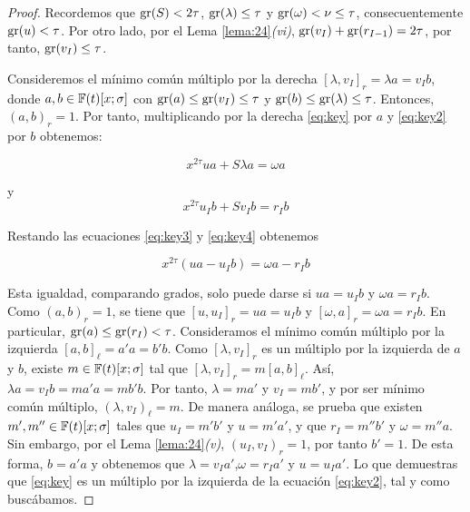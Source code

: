 \begin{proof}
    Recordemos que $\operatorname{gr}(S) < 2\tau$, $\operatorname{gr}(\lambda) \leq \tau$ y $\operatorname{gr}(\omega) < \nu \leq \tau$, consecuentemente $\operatorname{gr}(u) < \tau$. Por otro lado, por el Lema \ref{lema:24}\textit{(vi)}, $\operatorname{gr}(v_I) + \operatorname{gr}(r_{I-1}) = 2\tau$, por tanto, $\operatorname{gr}(v_I) \leq \tau$.

    Consideremos el mínimo común múltiplo por la derecha $[\lambda,v_I]_r = \lambda a = v_Ib$, donde $a,b \in \mathbb{F}(t)[x;\sigma]$ con $\operatorname{gr}(a) \leq \operatorname{gr}(v_I) \leq \tau$ y $\operatorname{gr}(b) \leq \operatorname{gr}(\lambda) \leq \tau$. Entonces, $(a,b)_r = 1$. Por tanto, multiplicando por la derecha \eqref{eq:key} por $a$ y \eqref{eq:key2} por $b$ obtenemos:

    \begin{equation}\label{eq:key3}
        x^{2\tau}ua + S\lambda a = \omega a
    \end{equation}
        
y        
    \begin{equation}\label{eq:key4}
        x^{2\tau}u_Ib + Sv_Ib = r_Ib
    \end{equation}

Restando las ecuaciones \eqref{eq:key3} y \eqref{eq:key4} obtenemos

\begin{equation}
    x^{2\tau}(ua - u_Ib) = \omega a - r_Ib
\end{equation}

Esta igualdad, comparando grados, solo puede darse si $ua = u_Ib$ y $\omega a = r_Ib$. Como $(a,b)_r = 1$, se tiene que $[u,u_I]_r = ua = u_Ib$ y $[\omega,a]_r = \omega a = r_Ib$. En particular, $\operatorname{gr}(a) \leq \operatorname{gr}(r_I) < \tau$. Consideramos el mínimo común múltiplo por la izquierda $[a,b]_\ell = a'a = b'b$.  Como $[\lambda,v_I]_r$ es un múltiplo por la izquierda de $a$ y $b$, existe $m \in \mathbb{F}(t)[x;\sigma]$ tal que $[\lambda,v_I]_r = m[a,b]_\ell$. Así, $\lambda a = v_Ib = ma'a = mb'b$. Por tanto, $\lambda = ma'$ y $v_I = mb'$, y por ser mínimo común múltiplo, $(\lambda,v_I)_\ell = m$. De manera análoga, se prueba que existen $m',m'' \in \mathbb{F}(t)[x;\sigma]$ tales que $u_I = m'b'$ y $u = m'a'$, y que $r_I = m''b'$ y $\omega = m''a$. Sin embargo, por el Lema \ref{lema:24}\textit{(v)}, $(u_I,v_I)_r = 1$, por tanto $b'=1$. De esta forma, $b = a'a$ y obtenemos que $\lambda = v_Ia'$,$\omega = r_Ia'$ y $u = u_Ia'$. Lo que demuestras que \eqref{eq:key} es un múltiplo por la izquierda de la ecuación \eqref{eq:key2}, tal y como buscábamos.
        

\end{proof}

